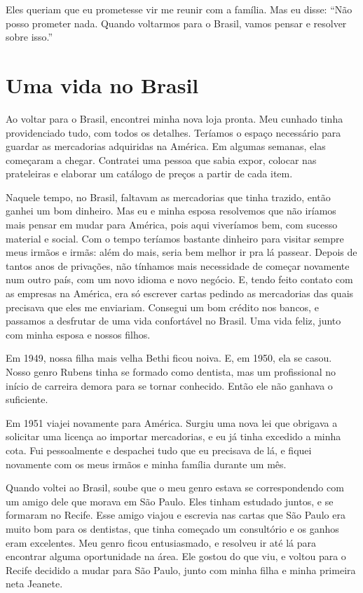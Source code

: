 Eles queriam que eu prometesse vir me reunir
com a família. Mas eu disse: ``Não posso prometer nada. Quando 
voltarmos para o Brasil, vamos pensar e resolver sobre isso.''

\chapter{Uma vida no Brasil}

Ao voltar para o Brasil, encontrei minha nova loja pronta. Meu
cunhado tinha providenciado tudo, com todos os detalhes. Teríamos
o espaço necessário para guardar as mercadorias adquiridas na América. 
Em algumas semanas, elas começaram a chegar. Contratei
uma pessoa que sabia expor, colocar nas
prateleiras e elaborar um catálogo de preços a partir de cada item.

Naquele tempo, no Brasil, faltavam as mercadorias que tinha
trazido, então ganhei um bom dinheiro. Mas eu e minha
esposa resolvemos que não iríamos mais pensar em mudar para América, pois 
aqui viveríamos bem, com sucesso material e social. Com o tempo
teríamos bastante dinheiro para visitar sempre meus irmãos e irmãs: além do mais, 
seria bem melhor ir pra lá passear. Depois de tantos anos de privações, não
tínhamos mais necessidade de começar novamente num outro país, com um
novo idioma e novo negócio. E, tendo feito contato com as empresas na América, 
era só escrever cartas pedindo as mercadorias das quais precisava que eles me
enviariam. Consegui um bom crédito nos bancos, e passamos a desfrutar de
uma vida confortável no Brasil. Uma vida feliz, junto com minha
esposa e nossos filhos.

Em 1949, nossa filha mais velha Bethi ficou noiva. E, em 1950, ela se
casou. Nosso genro Rubens tinha se formado como dentista, mas um
profissional no início de carreira demora para se tornar conhecido. Então ele não ganhava o suficiente.

Em 1951 viajei novamente para América. Surgiu uma
nova lei que obrigava a solicitar uma licença ao importar mercadorias, e eu já tinha excedido a minha cota. Fui pessoalmente e despachei tudo que eu precisava de lá, e fiquei novamente
com os meus irmãos e minha família durante um mês.

Quando voltei ao Brasil, soube que o meu genro estava se correspondendo
com um amigo dele que morava em São Paulo. Eles tinham estudado
juntos, e se formaram no Recife. Esse amigo viajou e escrevia nas cartas
que São Paulo era muito bom para os dentistas, que tinha começado um
consultório e os ganhos eram excelentes. Meu genro ficou
entusiasmado, e resolveu ir até lá para encontrar alguma oportunidade na área. Ele gostou do que viu, e voltou para o Recife decidido a mudar para São Paulo, junto com minha filha e
minha primeira neta Jeanete.

